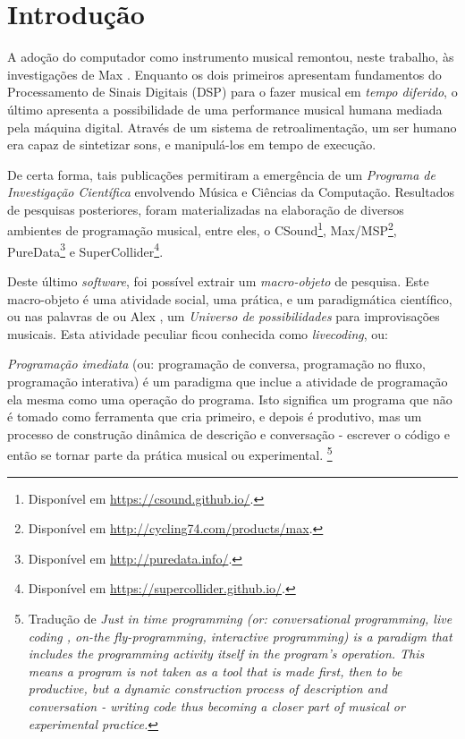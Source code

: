 \chapter*[Introdução]{Introdução}

A adoção do computador como instrumento musical remontou, neste trabalho, às investigações de Max . Enquanto os dois primeiros apresentam fundamentos do Processamento de Sinais Digitais (DSP) para o fazer musical em \emph{tempo diferido},  o último apresenta a possibilidade de uma performance musical humana mediada pela máquina digital. Através de um sistema de retroalimentação, um ser humano era capaz de sintetizar sons, e manipulá-los em tempo de execução.

De certa forma, tais publicações permitiram a emergência de um \emph{Programa de Investigação Científica} \cite{lakatos_falsification_1970,neto_lakatos_2008} envolvendo Música e Ciências da Computação. Resultados de pesquisas posteriores, foram materializadas na elaboração de diversos ambientes de programação musical, entre eles, o CSound\footnote{Disponível em \url{https://csound.github.io/}.}, Max/MSP\footnote{Disponível em \url{http://cycling74.com/products/max}.}, PureData\footnote{Disponível em \url{http://puredata.info/}.} e SuperCollider\footnote{Disponível em \url{https://supercollider.github.io/}.}.

Deste último \emph{software}, foi possível extrair um \emph{macro-objeto} de pesquisa. Este macro-objeto é uma atividade social, uma prática, e um paradigmática científico, ou nas palavras de  ou Alex , um \emph{Universo de possibilidades} para improvisações musicais.  Esta atividade peculiar ficou conhecida como \emph{livecoding}, ou:

\begin{citacao}
\emph{Programação imediata} (ou: programação de conversa, programação no fluxo, programação interativa) é um paradigma que inclue a atividade de programação ela mesma como uma operação do programa. Isto significa um programa que não é tomado como ferramenta que cria primeiro, e depois é produtivo, mas um processo de construção dinâmica de descrição e conversação - escrever o código e então se tornar parte da prática musical ou experimental. \cite[Verbete JITLib]{supercollider.org_supercollider_2014}\footnote{Tradução de \emph{Just in time programming (or: conversational programming, live coding , on-the fly-programming, interactive programming) is a paradigm that includes the programming activity itself in the program's operation. This means a program is not taken as a tool that is made first, then to be productive, but a dynamic construction process of description and conversation - writing code thus becoming a closer part of musical or experimental practice.}}
\end{citacao}


